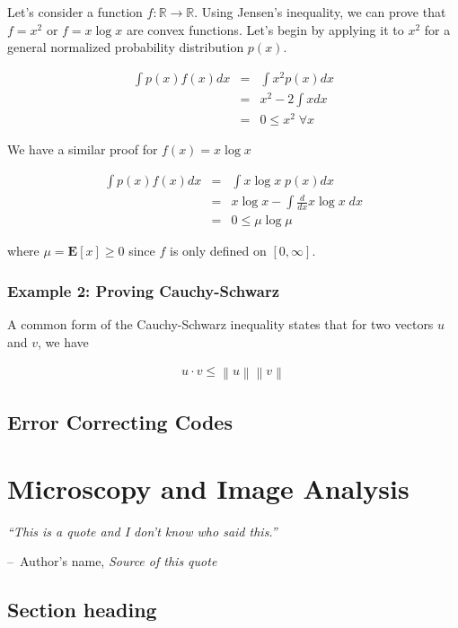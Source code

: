\documentclass[a4paper,11pt]{book}
\makeatletter
\newenvironment{chapquote}[2][2em]
  {\setlength{\@tempdima}{#1}%
   \def\chapquote@author{#2}%
   \parshape 1 \@tempdima \dimexpr\textwidth-2\@tempdima\relax%
   \itshape}
  {\par\normalfont\hfill--\ \chapquote@author\hspace*{\@tempdima}\par\bigskip}
\makeatother
\begin{document}
Let's consider a function $f: \mathbb{R} \rightarrow \mathbb{R}$. Using Jensen's inequality, we can prove that $f=x^{2}$ or $f=x\log x$ are convex functions. Let's begin by applying it to $x^{2}$ for a general normalized probability distribution $p(x)$.

\begin{eqnarray*}
\int p(x)f(x)dx & = & \int x^{2}p(x)dx\\
&=& x^{2} - 2\int xdx\\
&=& 0 \leq x^{2} \; \forall x
\end{eqnarray*}

We have a similar proof for $f(x) = x\log x$

\begin{eqnarray*}
\int p(x)f(x)dx & = & \int x\log x\; p(x)dx\\
&=& x\log x - \int \frac{d}{dx}x\log x\;dx\\
&=& 0 \leq \mu \log \mu
\end{eqnarray*}

where $\mu = \mathbf{E}[x] \geq 0$ since $f$ is only defined on $[0, \infty]$.

\subsection{Example 2: Proving Cauchy-Schwarz}

A common form of the Cauchy-Schwarz inequality states that for two vectors $u$ and $v$, we have

\newcommand\norm[1]{\left\lVert#1\right\rVert}
\begin{eqnarray*}
u \cdot v  \leq \norm{u}\norm{v}
\end{eqnarray*}

\section{Error Correcting Codes}

\chapter{Microscopy and Image Analysis}

\begin{chapquote}{Author's name, \textit{Source of this quote}}
``This is a quote and I don't know who said this.''
\end{chapquote}

\section{Section heading}
\end{document}
